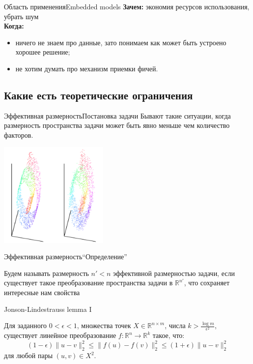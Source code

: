 \documentclass[14pt, fleqn, xcolor={dvipsnames, table}]{beamer}
\begin{document}
\begin{frame}{Область применения}{Embedded models}
\textbf{Зачем:} экономия ресурсов использования, убрать шум \\
\textbf{Когда:}
\begin{itemize}
  \item ничего не знаем про данные, зато понимаем как может быть устроено хорошее решение;
  \item не хотим думать про механизм приемки фичей.
\end{itemize}
\end{frame}

\subsection{Какие есть теоретические ограничения}
\begin{frame}{Эффективная размерность}{Постановка задачи}
Бывают такие ситуации, когда размерность пространства задачи может быть явно меньше чем количество факторов.
\begin{center}
\includegraphics[width=0.4\textwidth]{swiss-roll.png}
\end{center}
\end{frame}
\begin{frame}{Эффективная размерность}{``Определение''}
\begin{definition}
Будем называть размерность $n' < n$ эффективной размерностью задачи, если существует такое преобразование пространства задачи в $\mathbb{R}^{n'}$, что сохраняет интересные нам свойства
\end{definition}
\end{frame}

\begin{frame}{Jonson-Lindestrauss lemma I}
\begin{theorem}{}
Для заданного $0<\epsilon<1$, множества точек $X \in \mathbb{R}^{n\times m}$, числа $k > \frac{\log m}{\epsilon^2}$, существует линейное преобразование $f: \mathbb{R}^n \to \mathbb{R}^k$ такое, что:
$$
(1 - \epsilon) \|u - v\|_2^2 \le \|f(u) - f(v)\|_2^2 \le (1 + \epsilon) \|u - v\|_2^2
$$
для любой пары $(u,v) \in X^2$.
\end{theorem}
\end{frame}
\end{document}
